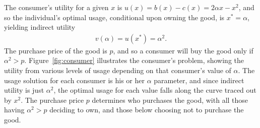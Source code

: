 \documentclass[12pt]{article}
\begin{document}
The consumer's utility for a given $x$ is $u(x) = b(x) - c(x) = 2 \alpha x - x^2$, and so the individual's optimal usage, conditional upon owning the good, is $x^* = \alpha$, yielding indirect utility 
\begin{align}
v(\alpha) = u(x^*) = \alpha^2.  
\end{align} 
The purchase price of the good is $p$, and so a consumer will buy the good only if $\alpha^2 > p$. 
Figure~\ref{fig:consumer} illustrates the consumer's problem, showing the utility from various levels of usage depending on that consumer's value of $\alpha$.
The usage solution for each consumer is his or her $\alpha$ parameter, and since indirect utility is just $\alpha^2$, the optimal usage for each value falls along the curve traced out by $x^2$.
The purchase price $p$ determines who purchases the good, with all those having $\alpha^2 > p$ deciding to own, and those below choosing not to purchase the good. 

\pgfmathsetmacro{\xstarOne}{\alphaOne}%
%

\pgfmathsetmacro{\xstarTwo}{\alphaTwo}%
%

\pgfmathsetmacro{\xstarThree}{\alphaThree}%
%
\end{document}

